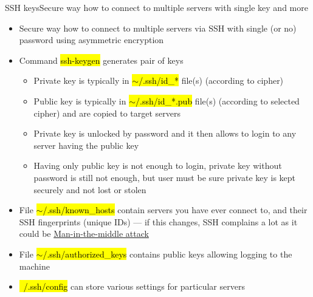 \documentclass[compress, ucs, xelatex, 11pt, xcolor=svgnames, aspectratio=169,
	hyperref={
		bookmarks=true,
		unicode=true,
		colorlinks=true,
		pdftitle={Linux, command line and MetaCentrum},
		plainpages=false,
		pdfauthor={Vojtech Zeisek},
		pdfsubject={Course about use of Linux command line, writing shell scripts and using MetaCentrum of CESNET},
		pdfcreator={XeLaTeX},
		pdfkeywords={Linux, GNU, BASH, shell, command line, MetaCentrum},
		linkcolor=DarkRed, %
		anchorcolor=DarkBlue, %
		citecolor=Indigo, %
		filecolor=NavyBlue, %
		menucolor=DarkMagenta, %
		urlcolor=DarkBlue, %
		pdftex},
	url={hyphens, lowtilde} %
	]{beamer}
\renewcommand{\texttt}[1]{\hl{\ttfamily #1}}
\begin{document}
\begin{frame}{SSH keys}{Secure way how to connect to multiple servers with single key and more}
	\begin{itemize}
		\item Secure way how to connect to multiple servers via SSH with single (or no) password using asymmetric encryption
		\item Command \texttt{ssh-keygen} generates pair of keys
		\begin{itemize}
			\item Private key is typically in \texttt{$\sim$/.ssh/id\_*} file(s) (according to cipher)
			\item Public key is typically in \texttt{$\sim$/.ssh/id\_*.pub} file(s) (according to selected cipher) and are copied to target servers
			\item Private key is unlocked by password and it then allows to login to any server having the public key
			\item Having only public key is not enough to login, private key without password is still not enough, but user must be sure private key is kept securely and not lost or stolen
		\end{itemize}
		\item File \texttt{$\sim$/.ssh/known\_hosts} contain servers you have ever connect to, and their SSH fingerprints (unique IDs) --- if this changes, SSH complains a lot as it could be \href{https://en.wikipedia.org/wiki/Man-in-the-middle_attack}{Man-in-the-middle attack}
		\item File \texttt{$\sim$/.ssh/authorized\_keys} contains public keys allowing logging to the machine
		\item \texttt{~/.ssh/config} can store various settings for particular servers
	\end{itemize}
\end{frame}
\end{document}
